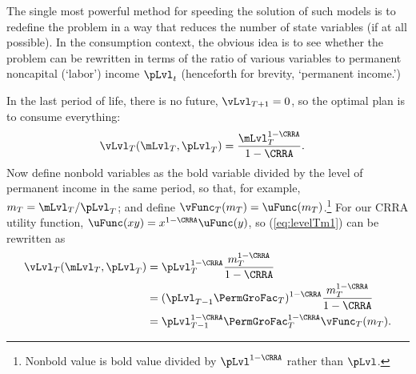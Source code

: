 \documentclass[titlepage, headings=optiontotocandhead]{Resources/texmf-local/tex/latex/econtex}
\begin{document}
The single most powerful method for speeding the solution of such models is to redefine the problem in a way that reduces the number of state variables (if at all possible).  In the consumption context, the obvious idea is to see whether the problem can be rewritten in terms of the ratio of various variables to permanent noncapital (`labor') income $\pLvl_{t}$ (henceforth for brevity, `permanent income.')

In the last {period} of life, there is no future, ${\vLvl}_{T+1} = 0$, so the optimal plan is to consume everything:
\begin{equation}\begin{gathered}\begin{aligned}
      {\vLvl}_{T}(\mLvl_{T},\pLvl_{T})  & = \frac{\mLvl_{T}^{1-\CRRA}}{1-\CRRA}. \label{eq:levelTm1}
    \end{aligned}\end{gathered}\end{equation}
Now define nonbold variables as the bold variable divided by the level of permanent income in the same period, so that, for example, ${m}_{T}=\mLvl_{T}/\pLvl_{T}$; and define $\vFunc_{T}({m}_{T}) = \uFunc({m}_{T})$.\footnote{Nonbold value is bold value divided by $\pLvl^{1-\CRRA}$ rather than $\pLvl$.}  For our CRRA utility function, $\uFunc(xy)=x^{1-\CRRA}\uFunc(y)$, so (\ref{eq:levelTm1}) can be rewritten as
\begin{equation}\begin{gathered}\begin{aligned}
      {\vLvl}_{T}(\mLvl_{T},\pLvl_{T}) & = \pLvl_{T}^{1-\CRRA}\frac{{m}_{T}^{1-\CRRA}}{1-\CRRA}                       \\
                                                & = (\pLvl_{T-1}\PermGroFac_{T})^{1-\CRRA}\frac{{m}_{T}^{1-\CRRA}}{1-\CRRA} \\
                                                &= \pLvl_{T-1}^{1-\CRRA}\PermGroFac_{T}^{1-\CRRA}\vFunc_{T}({m}_{T}). \label{eq:vT}
    \end{aligned}\end{gathered}\end{equation}
\end{document}
